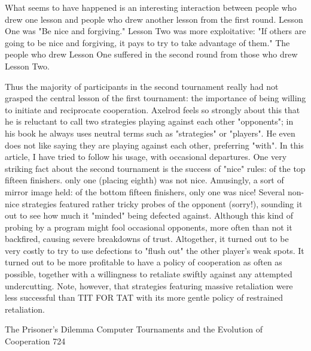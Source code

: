         What seems to have happened is an interesting interaction between people who drew one
lesson and people who drew another lesson from the first round. Lesson One was "Be nice and
forgiving." Lesson Two was more exploitative: "If others are going to be nice and forgiving, it
pays to try to take advantage of them." The people who drew Lesson One suffered in the second
round from those who drew Lesson Two.

        Thus the majority of participants in the second tournament really had not grasped
the central lesson of the first tournament: the importance of being willing to initiate and
reciprocate cooperation. Axelrod feels so strongly about this that he is reluctant to call
two strategies playing against each other "opponents"; in his book he always uses neutral
terms such as "strategies" or "players". He even does not like saying they are playing
against each other, preferring "with". In this article, I have tried to follow his usage, with
occasional departures. One very striking fact about the second tournament is the success
of "nice" rules: of the top fifteen finishers. only one (placing eighth) was not nice.
Amusingly, a sort of mirror image held: of the bottom fifteen finishers, only one was
nice!
        Several non-nice strategies featured rather tricky probes of the opponent (sorry!),
sounding it out to see how much it "minded" being defected against. Although this kind
of probing by a program might fool occasional opponents, more often than not it
backfired, causing severe breakdowns of trust. Altogether, it turned out to be very costly
to try to use defections to "flush out" the other player's weak spots. It turned out to be
more profitable to have a policy of cooperation as often as possible, together with a
willingness to retaliate swiftly against any attempted undercutting. Note, however, that
strategies featuring massive retaliation were less successful than TIT FOR TAT with its
more gentle policy of restrained retaliation.




The Prisoner's Dilemma Computer Tournaments and the Evolution of Cooperation              724

